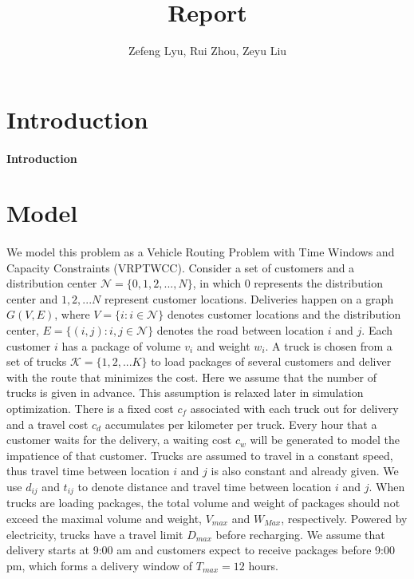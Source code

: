 \documentclass[12pt]{article}
\title{Report}
\author{Zefeng Lyu, Rui Zhou, Zeyu Liu}
\date{}
\numberwithin{equation}{section}
\begin{document}
\maketitle

\section{Introduction}

	\paragraph{Introduction}

\section{Model}
	
	\paragraph{}We model this problem as a Vehicle Routing Problem with Time Windows and Capacity Constraints (VRPTWCC)\parencite{Schneider2016}.  Consider a set of customers and a distribution center $\mathcal{N}=\{0,1,2,..., N\}$, in which 0 represents the distribution center and $1,2,...N$ represent customer locations. Deliveries happen on a graph $G(V, E)$, where $V=\{i: i\in \mathcal{N}\}$ denotes customer locations and the distribution center, $E=\{(i,j):i,j\in \mathcal{N}\}$ denotes the road between location $i$ and $j$.  Each customer $i$ has a package of volume $v_i$ and weight $w_i$. A truck is chosen from a set of trucks $\mathcal{K}=\{1,2,...K\}$ to load packages of several customers and deliver with the route that minimizes the cost. Here we assume that the number of trucks is given in advance. This assumption is relaxed later in simulation optimization. There is a fixed cost $c_f$ associated with each truck out for delivery and a travel cost $c_d$ accumulates per kilometer per truck. Every hour that a customer waits for the delivery, a waiting cost $c_w$ will be generated to model the impatience of that customer. Trucks are assumed to travel in a constant speed, thus travel time between location $i$ and $j$ is also constant and already given. We use $d_{ij}$ and $t_{ij}$ to denote distance and travel time between location $i$ and $j$. When trucks are loading packages, the total volume and weight of packages should not exceed the maximal volume and weight, $V_{max}$ and $W_{Max}$, respectively. Powered by electricity, trucks have a travel limit $D_{max}$ before recharging. We assume that delivery starts at 9:00 am and customers expect to receive packages before 9:00 pm, which forms a delivery window of $T_{max}=12$ hours.
	
\end{document}
